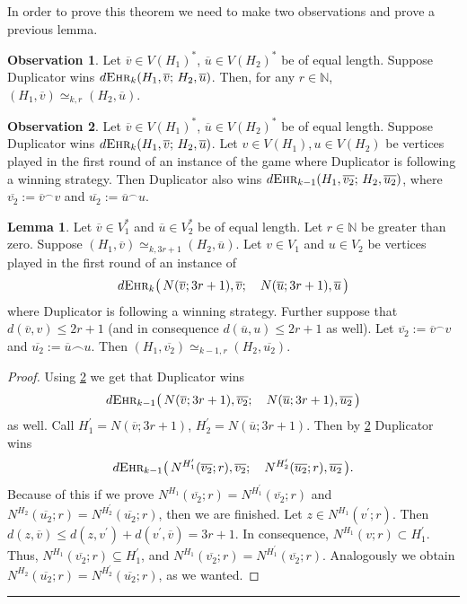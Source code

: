 \documentclass[12pt,notitlepage,a4paper]{article}
\theoremstyle{definition}
\newtheorem{obs}{Observation}[section]
\newtheorem{lemma}{Lemma}[section]
\newcommand{\N}{\mathbb{N}}
\newcommand{\ehr}{\textsc{Ehr}}
\begin{document}
In order to prove this theorem we need to make two observations
and prove a previous lemma. 

\begin{obs} \label{obs1}
	Let
	$\overline{v}\in V(H_1)^*$, $\overline{u}\in V(H_2)^*$ be of equal length. Suppose
	Duplicator wins $d\ehr_k(H_1,\overline{v}; \, H_2,\overline{u})$.
	Then, for any $r\in \N$, $(H_1, \overline{v})\simeq_{k,r} 
	(H_2,\overline{u})$. 
\end{obs}



\begin{obs} \label{obs2}
	Let
	$\overline{v}\in V(H_1)^*$, $\overline{u}\in V(H_2)^*$ be of equal length. Suppose 
	Duplicator wins $d\ehr_k(H_1,\overline{v};\,H_2,\overline{u})$. 
	Let $v\in V(H_1),u\in V(H_2)$ be vertices
	played in the first round of an instance of the game 
	where Duplicator is following a winning strategy. Then 
	Duplicator also wins $d\ehr_{k-1}(H_1,\overline{v_2}; \,
	H_2,\overline{u_2})$, where $\overline{v_2}:=\overline{v}^\smallfrown v$
	and $\overline{u_2}:=\overline{u}^\smallfrown u$.
\end{obs}

\begin{lemma} \label{lemm:Duplicator}
	Let $\overline{v}\in V_1^*$ and
	$\overline{u} \in V_2^*$ be of equal length. Let
	$r\in \N$ be greater than zero. Suppose
	$(H_1,\overline{v})\simeq_{k,3r+1} (H_2,\overline{u})$.
	Let $v \in V_1$ and $u\in V_2$
	be vertices played in the first round of an instance of 
	\[
	d\ehr_k\big(\, N(\overline{v};3r+1),
	\overline{v}; \quad N(\overline{u};3r+1),\overline{u}\, \big)
	\]
	where Duplicator is following a winning strategy. Further suppose
	that $d(\overline{v},v)\leq 2r+1$ (and in consequence
	$d(\overline{u},u)\leq 2r+1$ as well). 
	Let $\overline{v_2}:=\overline{v}^\smallfrown v$
	and $\overline{u_2}:=\overline{u}\smallfrown u$.
	Then $(H_1,\overline{v_2})\simeq_{k-1,r}
	(H_2,\overline{u_2})$.
\end{lemma}

\begin{proof}
	Using \cref{obs2} we get that Duplicator wins 
	\[
	d\ehr_{k-1}\big(\, N(\overline{v};3r+1),
	\overline{v_2}; \quad N(\overline{u};3r+1)
	,\overline{u_2} \, \big)\]
	as well. Call $H^\prime_1=N(\overline{v};3r+1)$,
	$H^\prime_2=N(\overline{u};3r+1)$. Then by \cref{obs2}
	Duplicator wins
	\[
	d\ehr_{k-1}\big(\, N^{H^\prime_1}(
	\overline{v_2};r),\overline{v_2};\quad
	N^{H^\prime_2}(\overline{u_2};r),\overline{u_2}\, \big).
	\]
	Because of this if we prove $N^{H_1}(\overline{v_2};r)
	=N^{H^\prime_1}(\overline{v_2};r)$ and $N^{H_2}(\overline{u_2};r)
	=N^{H^\prime_2}(\overline{u_2};r)$, then we are finished. 
	Let $z\in N^{H_1}(v^\prime;r)$. Then
	$d(z,\overline{v})\leq d(z,v^\prime)+d(v^\prime,\overline{v})=3r+1$.
	In consequence, $N^{H_1}(v;r)\subset H^\prime_1$. Thus,
	$N^{H_1}(\overline{v_2};r)\subseteq H^\prime_1$, and $N^{H_1}(\overline{v_2};r)
	=N^{H^\prime_1}(\overline{v_2};r)$. Analogously we obtain 
	$N^{H_2}(\overline{u_2};r)=N^{H^\prime_2}(\overline{u_2};r)$, as we wanted. 
\end{proof}
\noindent\rule{2cm}{0.4pt}\par
\end{document}
